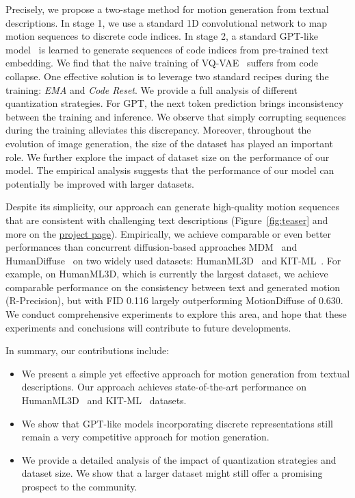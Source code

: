 \documentclass[10pt,twocolumn,letterpaper]{article}
\begin{document}
Precisely, we propose a two-stage method for motion generation from textual descriptions. In stage 1, we use a standard 1D convolutional network to map motion sequences to discrete code indices. In stage 2, a standard GPT-like model~\cite{vaswani2017attention,radford2018improving} is learned to generate sequences of code indices from pre-trained text embedding.
We find that the naive training of VQ-VAE~\cite{van2017neural} suffers from code collapse. One effective solution is to leverage two standard recipes during the training: \textit{EMA} and \textit{Code Reset}. We provide a full analysis of different quantization strategies. For GPT, the next token prediction brings inconsistency between the training and inference. We observe that simply corrupting sequences during the training alleviates this discrepancy. Moreover, throughout the evolution of image generation, the size of the dataset has played an important role. We further explore the impact of dataset size on the performance of our model. The empirical analysis suggests that the performance of our model can potentially be improved with larger datasets.


Despite its simplicity, our approach can generate high-quality motion sequences that are consistent with challenging text descriptions (Figure~\ref{fig:teaser} and more on the \href{https://mael-zys.github.io/T2M-GPT/}{project page}). Empirically, we achieve comparable or even better performances than concurrent diffusion-based approaches MDM~\cite{tevet2022MDM} and HumanDiffuse~\cite{zhang2022motiondiffuse} on two widely used datasets: HumanML3D~\cite{guo2022generating} and KIT-ML~\cite{plappert2016kit}. For example, on HumanML3D, which is currently the largest dataset, we achieve comparable performance on the consistency between text and generated motion (R-Precision), but with FID 0.116 largely outperforming MotionDiffuse of 0.630.
We conduct comprehensive experiments to explore this area, and hope that these experiments and conclusions will contribute to future developments.

In summary, our contributions include: 
\begin{itemize}
    \item We present a simple yet effective approach for motion generation from textual descriptions. Our approach achieves state-of-the-art performance on HumanML3D~\cite{guo2022generating} and KIT-ML~\cite{plappert2016kit} datasets.
    \item We show that GPT-like models incorporating discrete representations still remain a very competitive approach for motion generation.
    \item We provide a detailed analysis of the impact of quantization strategies and dataset size. We show that a larger dataset might still offer a promising prospect to the community.
\end{itemize}
\end{document}
